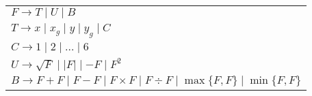 \begin{tabular}{l}
    $F \rightarrow T \mid U \mid B $ \\
    $T \rightarrow x \mid x_g \mid y \mid y_g \mid C$ \\ 
    $C \rightarrow 1 \mid 2 \mid \dots \mid 6$ \\
    $U \rightarrow \sqrt{F} \mid \left\vert F \right\vert \mid -F \mid F^2$ \\
    $B \rightarrow  F + F \mid F - F \mid F \times F \mid F \div F \mid \max\{F, F\} \mid \min\{F, F\}$\\
\end{tabular}